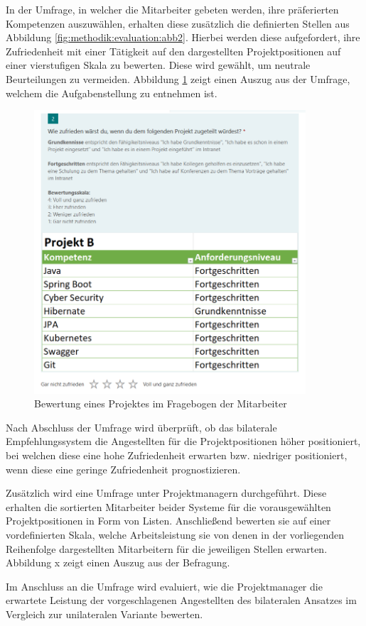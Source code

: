 In der Umfrage, in welcher die Mitarbeiter gebeten werden, ihre präferierten Kompetenzen auszuwählen, erhalten diese zusätzlich die definierten Stellen aus Abbildung \ref{fig:methodik:evaluation:abb2}. Hierbei werden diese aufgefordert, ihre Zufriedenheit mit einer Tätigkeit auf den dargestellten Projektpositionen auf einer vierstufigen Skala zu bewerten. Diese wird gewählt, um neutrale Beurteilungen zu vermeiden. Abbildung \ref{fig:methodik:evaluation:abb1} zeigt einen Auszug aus der Umfrage, welchem die Aufgabenstellung zu entnehmen ist.

\begin{figure}[h]
	\centering
	\includegraphics[width=0.9\textwidth]{gfx/projekt-b-umfrage.png}
	\caption{Bewertung eines Projektes im Fragebogen der Mitarbeiter}
	\label{fig:methodik:evaluation:abb1}
\end{figure}

Nach Abschluss der Umfrage wird überprüft, ob das bilaterale Empfehlungssystem die Angestellten für die Projektpositionen höher positioniert, bei welchen diese eine hohe Zufriedenheit erwarten bzw. niedriger positioniert, wenn diese eine geringe Zufriedenheit prognostizieren.

Zusätzlich wird eine Umfrage unter Projektmanagern durchgeführt. Diese erhalten die sortierten Mitarbeiter beider Systeme für die vorausgewählten Projektpositionen in Form von Listen. Anschließend bewerten sie auf einer vordefinierten Skala, welche Arbeitsleistung sie von denen in der vorliegenden Reihenfolge dargestellten Mitarbeitern für die jeweiligen Stellen erwarten. Abbildung x zeigt einen Auszug aus der Befragung.

Im Anschluss an die Umfrage wird evaluiert, wie die Projektmanager die erwartete Leistung der vorgeschlagenen Angestellten des bilateralen Ansatzes im Vergleich zur unilateralen Variante bewerten.
